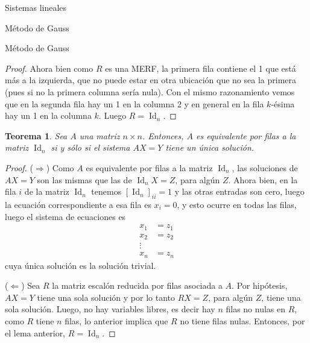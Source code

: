 \documentclass[a4paper,12pt,twoside,spanish,reqno]{amsbook}
\newtheorem{teorema}{Teorema}[section]
\theoremstyle{definition}
\theoremstyle{remark}
\newcommand{\Id}{\operatorname{Id}}
\begin{document}
\begin{chapter}{Sistemas lineales}
\begin{section}{Método de Gauss }
\begin{subsection}{Método de Gauss}
\begin{proof}
                    Ahora bien como $R$ es una MERF, la primera fila contiene el 1 que está más a la izquierda, que no puede estar en otra ubicación que no sea la primera (pues si no la primera columna sería nula). Con el mismo razonamiento vemos que en la segunda fila hay un 1 en la columna 2 y en general en la fila $k$-ésima hay un 1 en la columna $k$. Luego $R=\Id_n$.
                \end{proof}			
                
                \begin{teorema}
                    Sea $A$ una matriz $n \times n$. Entonces, $A$ es equivalente por filas a la matriz $\Id_n$  si y sólo si el sistema $AX = Y$ tiene un única solución. 
                \end{teorema}
                \begin{proof}
                    ($\Rightarrow$) Como $A$ es equivalente por filas a la matriz $\Id_n$, las soluciones de $AX =Y$ son las mismas que las de $\Id_nX=Z$, para algún $Z$. Ahora bien,  en la fila $i$ de la matriz $\Id_n$ tenemos $[\Id_n]_{ii} =1$ y las otras entradas son cero, luego la ecuación correspondiente a esa fila es $x _i =0$, y esto ocurre en todas las filas, luego el sistema de ecuaciones es
                    \begin{align*}
                    x_1 &=z_1 \\ x_2 &= z_2 \\ \vdots \\ x_n &= z_n
                    \end{align*}
                    cuya única solución es la solución trivial.
                    
                    ($\Leftarrow$) Sea $R$ la matriz escalón reducida por filas asociada a $A$. Por hipótesis, $AX=Y$ tiene una sola solución y  por lo tanto $RX=Z$, para algún $Z$, tiene una sola solución. Luego, no hay variables libres, es decir hay $n$ filas no nulas en $R$, como $R$ tiene $n$ filas, lo anterior implica que $R$ no tiene filas nulas. Entonces, por el lema anterior, $R=\Id_n$.
                \end{proof}
            \end{subsection}
            
            
            

\end{section}
\end{chapter}
\end{document}
